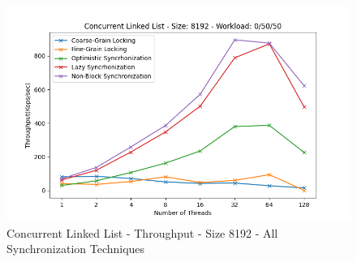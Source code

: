 \documentclass[../final_report.tex]{subfiles}
\begin{document}
\begin{figure}[H]
        \includegraphics[scale=0.4]{outFiles/plots/concurrent_data_structs_all_8192_0_50_50.png}
    \caption{Concurrent Linked List - Throughput - Size 8192 - All Synchronization Techniques}
    \label{fig:Concurrent Linked List - Throughput - Size 8192 - All Synchronization Techniques}
\end{figure}
\end{document}
